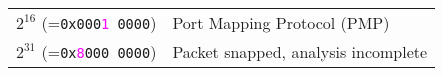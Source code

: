 \documentclass[documentation]{subfiles}
\begin{document}
\begin{longtable}{rl}
        $2^{16}$ (={\tt 0x000\textcolor{magenta}{1} 0000}) & Port Mapping Protocol (PMP)\\
        $2^{31}$ (={\tt 0x\textcolor{magenta}{8}000 0000}) & Packet snapped, analysis incomplete\\
        \bottomrule
    \end{longtable}
\end{document}
